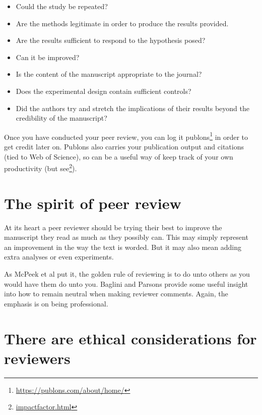 \documentclass[
]{krantz}
\providecommand{\tightlist}{%
  \setlength{\itemsep}{0pt}\setlength{\parskip}{0pt}}
\renewcommand{\href}[2]{#2\footnote{\url{#1}}}
\begin{document}
\begin{itemize}
\tightlist
\item
  Could the study be repeated?
\item
  Are the methods legitimate in order to produce the results provided.
\item
  Are the results sufficient to respond to the hypothesis posed?
\item
  Can it be improved?
\item
  Is the content of the manuscript appropriate to the journal?
\item
  Does the experimental design contain sufficient controls?
\item
  Did the authors try and stretch the implications of their results beyond the credibility of the manuscript?
\end{itemize}

Once you have conducted your peer review, you can log it \href{https://publons.com/about/home/}{publons} in order to get credit later on. Publons also carries your publication output and citations (tied to Web of Science), so can be a useful way of keep track of your own productivity (\href{impactfactor.html}{but see}).

\hypertarget{the-spirit-of-peer-review}{%
\section{The spirit of peer review}\label{the-spirit-of-peer-review}}

At its heart a peer reviewer should be trying their best to improve the manuscript they read as much as they possibly can. This may simply represent an improvement in the way the text is worded. But it may also mean adding extra analyses or even experiments.

As McPeek et al \citeyearpar{mcpeek2009golden} put it, the golden rule of reviewing is to do unto others as you would have them do unto you. Baglini and Parsons \citeyearpar{baglini2020if} provide some useful insight into how to remain neutral when making reviewer comments. Again, the emphasis is on being professional.

\hypertarget{there-are-ethical-considerations-for-reviewers}{%
\section{There are ethical considerations for reviewers}\label{there-are-ethical-considerations-for-reviewers}}
\end{document}

